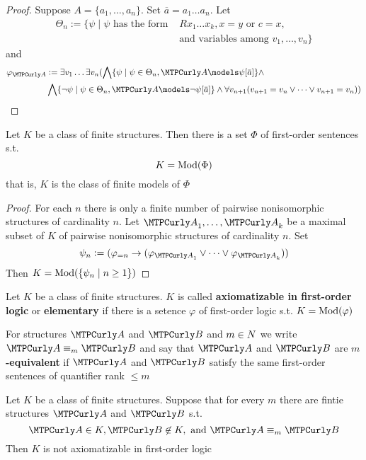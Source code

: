 \documentclass[11pt]{article}
\begin{document}
\begin{proof}
Suppose \(A=\{a_1,\dots,a_n\}\). Set \(\overbar{a}=a_1\dots a_n\). Let
\begin{align*}
\Theta_n:=\{\psi\mid\psi\text{ has the form }&Rx_1\dots x_k,x=y\text{ or }c=x,\\
&\text{and variables among }v_1,\dots,v_n\}
\end{align*}
and
\begin{align*}
\varphi_{\cala}&:=\exists v_1\dots\exists v_n(\bigwedge\{\psi\mid\psi\in\Theta_n,
\cala\models\psi[\overbar{a}]\}\wedge\\
&\bigwedge\{\neg\psi\mid\psi\in\Theta_n,\cala\models\neg\psi[\overbar{a}]\}\wedge
\forall v_{n+1}(v_{n+1}=v_n\vee\dots\vee v_{n+1}=v_n))
\end{align*}
\end{proof}

\begin{corollary}[]
Let \(K\) be a class of finite structures. Then there is a set \(\Phi\) of
first-order sentences s.t.
\begin{equation*}
K=\operatorname{Mod}(\Phi)
\end{equation*}
that is, \(K\) is the class of finite models of \(\Phi\)
\end{corollary}

\begin{proof}
For each \(n\) there is only a finite number of pairwise nonisomorphic
structures of cardinality \(n\). Let \(\cala_1,\dots,\cala_k\) be a maximal
subset of \(K\) of pairwise nonisomorphic structures of cardinality \(n\).
Set
\begin{equation*}
\psi_n:=(\varphi_{=n}\to(\varphi_{\cala_1}\vee\dots\vee\varphi_{\cala_k}))
\end{equation*}
Then \(K=\operatorname{Mod}(\{\psi_n\mid n\ge1\})\)
\end{proof}

\begin{definition}[]
Let \(K\) be a class of finite structures. \(K\) is called
\textbf{axiomatizable in first-order logic} or \textbf{elementary} if there is a setence
\(\varphi\) of first-order logic s.t. \(K=\operatorname{Mod}(\varphi)\)
\end{definition}

For structures \(\cala\) and \(\calb\) and \(m\in\relax{N}\) we write
\(\cala\equiv_m\calb\) and say that \(\cala\) and \(\calb\) are
\textbf{\(m\)-equivalent} if \(\cala\) and \(\calb\) satisfy the same first-order
sentences of quantifier rank \(\le m\)

\begin{theorem}[]
Let \(K\) be a class of finite structures. Suppose that for every \(m\) there
are fintie structures \(\cala\) and \(\calb\) s.t.
\begin{equation*}
\cala\in K,\calb\not\in K,\text{ and }\cala\equiv_m\calb
\end{equation*}
Then \(K\) is not axiomatizable in first-order logic
\end{theorem}
\end{document}
